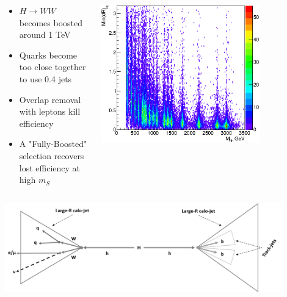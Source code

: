 \documentclass{beamer}
\newcommand*{\header}[1]{\fontsize{16}{8}\selectfont \textbf{{\color{MyPurple}{#1}}}}
\begin{document}
\begin{frame}
\begin{center}
\header{Improvements for Full Run II}
\end{center}
\vspace{-0.5cm}
\begin{columns}
\begin{column}{0.5\textwidth}
\color{MyPurple}{Motivation}
\begin{itemize}
\footnotesize
\item $H\rightarrow{}WW$ becomes boosted around 1 TeV 
\item Quarks become too close together to use 0.4 jets
\item Overlap removal with leptons kill efficiency
\item A "Fully-Boosted" selection recovers lost efficiency at high $m_S$
\end{itemize}
\end{column}
\begin{column}{0.5\textwidth}
\begin{center}
\includegraphics[width=0.75\textwidth]{figures/drminlq}
\end{center}
\end{column}
\end{columns}
\end{frame}

\begin{frame}
\begin{center}
\header{Event Selection}
\end{center}
\begin{center}
\includegraphics[width=0.9\textwidth]{figures/full_boosted}
\end{center}
\end{frame}
\end{document}
